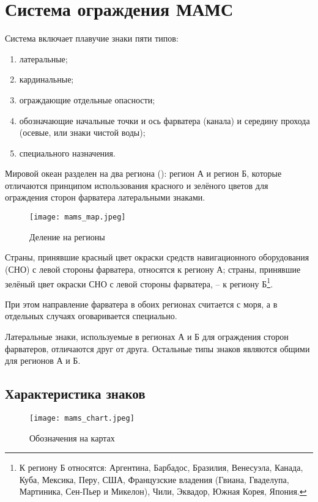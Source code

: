 \chapter{Система ограждения МАМС}\label{app:mams}

Система включает плавучие знаки пяти типов:
\begin{enumerate}
\item латеральные;
\item кардинальные;
\item ограждающие отдельные опасности;
\item обозначающие начальные точки и ось фарватера (канала) и середину прохода (осевые, или знаки чистой воды);
\item специального назначения.
\end{enumerate}

Мировой океан разделен на два региона (): регион А и регион Б, которые
отличаются принципом использования красного и зелёного цветов для
ограждения сторон фарватера латеральными знаками.

\begin{figure}[htb]
  \centering{}
  \texttt{[image: mams\_map.jpeg]}
  \caption{Деление на регионы}
  \label{fig:mams-map}
\end{figure}

Страны, принявшие красный цвет окраски средств навигационного
оборудования (СНО) с левой стороны фарватера, относятся к региону А;
страны, принявшие зелёный цвет окраски СНО с левой стороны фарватера,
\--- к региону Б\footnote{К региону Б относятся: Аргентина, Барбадос,
  Бразилия, Венесуэла, Канада, Куба, Мексика, Перу, США, Французские
  владения (Гвиана, Гваделупа, Мартиника, Сен-Пьер и Микелон), Чили,
  Эквадор, Южная Корея, Япония.}.

При этом направление фарватера в обоих регионах считается с моря, а в
отдельных случаях оговаривается специально.

Латеральные знаки, используемые в регионах А и Б для ограждения сторон
фарватеров, отличаются друг от друга. Остальные типы знаков являются
общими для регионов А и Б.

\section{Характеристика знаков}

\begin{figure}[htb]
  \centering{}
  \texttt{[image: mams\_chart.jpeg]}
  \caption{Обозначения на картах}
  \label{fig:mams-chart}
\end{figure}

